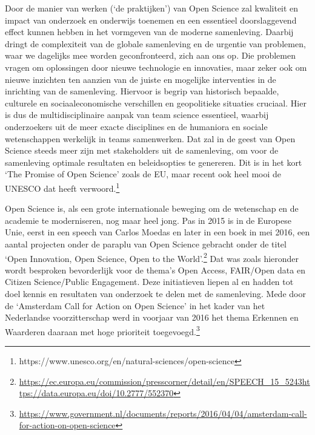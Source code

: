 \documentclass[empirical, authordate, ]{new-jote-article}
\begin{document}
	Door de manier van werken (‘de praktijken') van Open Science zal kwaliteit en impact van onderzoek en onderwijs toenemen en een essentieel doorslaggevend effect kunnen hebben in het vormgeven van de moderne samenleving. Daarbij dringt de complexiteit van de globale samenleving en de urgentie van problemen, waar we dagelijks mee worden geconfronteerd, zich aan ons op. Die problemen vragen om oplossingen door nieuwe technologie en innovaties, maar zeker ook om nieuwe inzichten ten aanzien van de juiste en mogelijke interventies in de inrichting van de samenleving. Hiervoor is begrip van historisch bepaalde, culturele en sociaaleconomische verschillen en geopolitieke situaties cruciaal. Hier is dus de multidisciplinaire aanpak van team science essentieel, waarbij onderzoekers uit de meer exacte disciplines en de humaniora en sociale wetenschappen werkelijk in teams samenwerken. Dat zal in de geest van Open Science steeds meer zijn met stakeholders uit de samenleving, om voor de samenleving optimale resultaten en beleidsopties te genereren. Dit is in het kort ‘The Promise of Open Science' zoals de EU, maar recent ook heel mooi de UNESCO dat heeft verwoord.\footnote{https://www.unesco.org/en/natural-sciences/open-science}



	Open Science is, als een grote internationale beweging om de wetenschap en de academie te moderniseren, nog maar heel jong. Pas in 2015 is in de Europese Unie, eerst in een speech van Carlos Moedas en later in een boek in mei 2016, een aantal projecten onder de paraplu van Open Science gebracht onder de titel ‘Open Innovation, Open Science, Open to the World'.\footnote{\href{https://ec.europa.eu/commission/presscorner/detail/en/SPEECH_15_5243}{https://ec.europa.eu/commission/presscorner/detail/en/SPEECH\_15\_5243}\href{https://data.europa.eu/doi/10.2777/552370}{https://data.europa.eu/doi/10.2777/552370}} Dat was zoals hieronder wordt besproken bevorderlijk voor de thema's Open Access, FAIR/Open data en Citizen Science/Public Engagement. Deze initiatieven liepen al en hadden tot doel kennis en resultaten van onderzoek te delen met de samenleving. Mede door de ‘Amsterdam Call for Action on Open Science' in het kader van het Nederlandse voorzitterschap werd in voorjaar van 2016 het thema Erkennen en Waarderen daaraan met hoge prioriteit toegevoegd.\footnote{\href{https://www.government.nl/documents/reports/2016/04/04/amsterdam-call-for-action-on-open-science}{https://www.government.nl/documents/reports/2016/04/04/amsterdam-call-for-action-on-open-science}}
\end{document}
